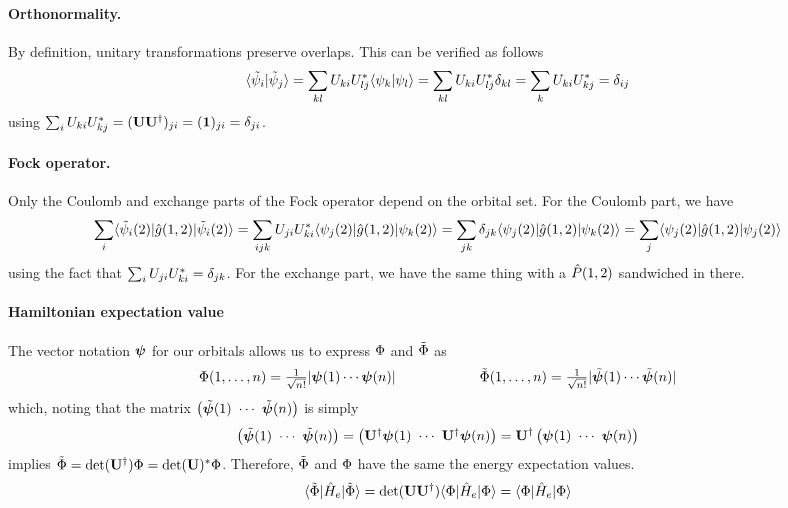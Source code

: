 \documentclass[11pt]{article}
\numberwithin{equation}{section}
\begin{document}
\paragraph{Orthonormality.}
By definition, unitary transformations preserve overlaps.
This can be verified as follows
\begin{align*}
  \langle\tilde{\psi }_i|\tilde{\psi }_j\rangle
=
\sum_{kl}
  U_{ki}U_{lj}^*
  \langle\psi _k|\psi _l\rangle
=
\sum_{kl}
  U_{ki}U_{lj}^*
  \delta _{kl}
=
\sum_k
  U_{ki}U_{kj}^*
=
  \delta _{ij}
\end{align*}
using $\sum_i U_{ki}U_{kj}^*=(\mathbf{U}\mathbf{U}^\dagger)_{ji}=(\mathbf{1})_{ji}=\delta _{ji}$.

\paragraph{Fock operator.}
Only the Coulomb and exchange parts of the Fock operator depend on the orbital set.
For the Coulomb part, we have
{\small\begin{align*}
\sum_i
  \langle\tilde{\psi }_i(2)|\hat{g}(1,2)|\tilde{\psi }_i(2)\rangle
=
\sum_{ijk}
  U_{ji}U_{ki}^*
  \langle\psi _j(2)|\hat{g}(1,2)|\psi _k(2)\rangle
=
\sum_{jk}
  \delta _{jk}
  \langle\psi _j(2)|\hat{g}(1,2)|\psi _k(2)\rangle
=
\sum_j
  \langle\psi _j(2)|\hat{g}(1,2)|\psi _j(2)\rangle
\end{align*} \underline{}}%
using the fact that $\sum_i U_{ji}U_{ki}^*=\delta _{jk}$.
For the exchange part, we have the same thing with a $\hat{P}(1,2)$ sandwiched in there.

\paragraph{Hamiltonian expectation value}
The vector notation $\bm\y$ for our orbitals allows us to express $\Phi $ and $\tilde{\Phi }$ as
\begin{align*}
  \F(1,\ld,n)
=
  \tfrac{1}{\sqrt{n!}}
  |\bm\y(1)\cd\bm\y(n)|
\sp\sp
  \tl\F(1,\ld,n)
=
  \tfrac{1}{\sqrt{n!}}
  |\tl{\bm\y}(1)\cd\tl{\bm\y}(n)|
\end{align*}
which, noting that the matrix $\ma{\tl{\bm\y}(1)\ \cd\ \tl{\bm\y}(n)}$ is simply
\begin{align*}
  \ma{\tl{\bm\y}(1)\ \cd\ \tl{\bm\y}(n)}
=
  \ma{\bo{U}\dg\bm\y(1)\ \cd\ \bo{U}\dg\bm\y(n)}
=
  \bo{U}\dg\ma{\bm\y(1)\ \cd\ \bm\y(n)}
\end{align*}
implies $\tilde{\Phi }=\det(\mathbf{U}^\dagger)\Phi =\det(\mathbf{U})^*\Phi $.
Therefore, $\tilde{\Phi }$ and $\Phi $ have the same the energy expectation values.
\begin{align}
  \langle\tilde{\Phi }|\hat{H}_e|\tilde{\Phi }\rangle
=
  \det(\mathbf{U}\mathbf{U}^\dagger)\langle\Phi |\hat{H}_e|\Phi \rangle
=
  \langle\Phi |\hat{H}_e|\Phi \rangle
\end{align}
\end{document}

